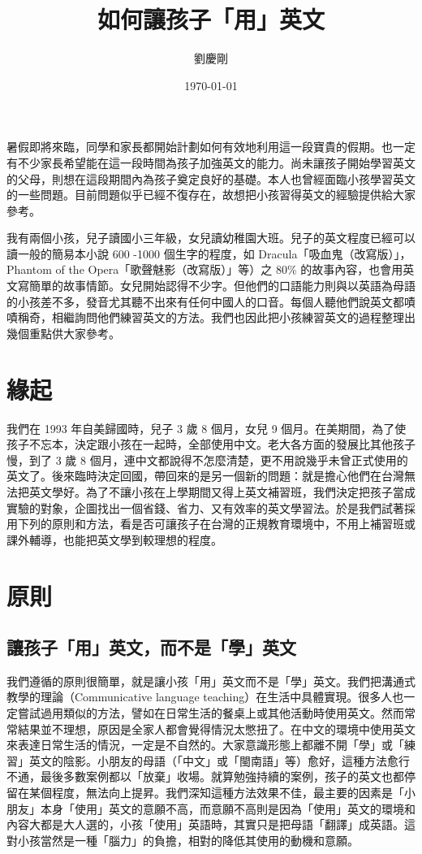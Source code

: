 \documentclass[12pt, a4paper]{article}
\title{ {\MB 如何讓孩子「用」英文}}	%
\author{{\SM 劉慶剛}}				%
\date{{\TT \today }}
\begin{document}
\maketitle
\fontsize{12}{22pt}\selectfont 

暑假即將來臨，同學和家長都開始計劃如何有效地利用這一段寶貴的假期。也一定有不少家長希望能在這一段時間為孩子加強英文的能力。尚未讓孩子開始學習英文的父母，則想在這段期間內為孩子奠定良好的基礎。本人也曾經面臨小孩學習英文的一些問題。目前問題似乎已經不復存在，故想把小孩習得英文的經驗提供給大家參考。

我有兩個小孩，兒子讀國小三年級，女兒讀幼稚園大班。兒子的英文程度已經可以讀一般的簡易本小說 600 -1000 個生字的程度，如  Dracula「吸血鬼（改寫版）」，Phantom of the Opera「歌聲魅影（改寫版）」等）之 80\%  的故事內容，也會用英文寫簡單的故事情節。女兒開始認得不少字。但他們的口語能力則與以英語為母語的小孩差不多，發音尤其聽不出來有任何中國人的口音。每個人聽他們說英文都嘖嘖稱奇，相繼詢問他們練習英文的方法。我們也因此把小孩練習英文的過程整理出幾個重點供大家參考。


\section{緣起}
我們在 1993 年自美歸國時，兒子 3 歲 8 個月，女兒 9 個月。在美期間，為了使孩子不忘本，決定跟小孩在一起時，全部使用中文。老大各方面的發展比其他孩子慢，到了 3 歲 8 個月，連中文都說得不怎麼清楚，更不用說幾乎未曾正式使用的英文了。後來臨時決定回國，帶回來的是另一個新的問題：就是擔心他們在台灣無法把英文學好。為了不讓小孩在上學期間又得上英文補習班，我們決定把孩子當成實驗的對象，企圖找出一個省錢、省力、又有效率的英文學習法。於是我們試著採用下列的原則和方法，看是否可讓孩子在台灣的正規教育環境中，不用上補習班或課外輔導，也能把英文學到較理想的程度。

\section{原則}
\subsection{讓孩子「用」英文，而不是「學」英文}
我們遵循的原則很簡單，就是讓小孩「用」英文而不是「學」英文。我們把溝通式教學的理論（Communicative language teaching）在生活中具體實現。很多人也一定嘗試過用類似的方法，譬如在日常生活的餐桌上或其他活動時使用英文。然而常常結果並不理想，原因是全家人都會覺得情況太憋扭了。在中文的環境中使用英文來表達日常生活的情況，一定是不自然的。大家意識形態上都離不開「學」或「練習」英文的陰影。小朋友的母語（「中文」或「閩南語」等）愈好，這種方法愈行不通，最後多數案例都以「放棄」收場。就算勉強持續的案例，孩子的英文也都停留在某個程度，無法向上提昇。我們深知這種方法效果不佳，最主要的因素是「小朋友」本身「使用」英文的意願不高，而意願不高則是因為「使用」英文的環境和內容大都是大人選的，小孩「使用」英語時，其實只是把母語「翻譯」成英語。這對小孩當然是一種「腦力」的負擔，相對的降低其使用的動機和意願。
\end{document}
